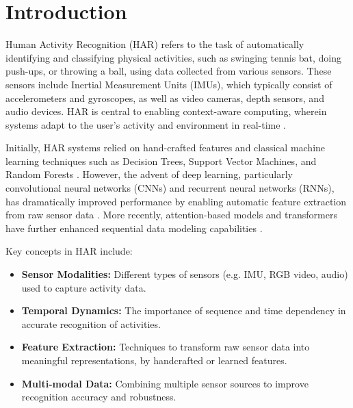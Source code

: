 \chapter{Introduction}
{\renewcommand{\thefootnote}{}}

Human Activity Recognition (HAR) refers to the task of automatically identifying and classifying physical activities, such as swinging tennis bat, doing push-ups, or throwing a ball, using data collected from various sensors. These sensors include Inertial Measurement Units (IMUs), which typically consist of accelerometers and gyroscopes, as well as video cameras, depth sensors, and audio devices. HAR is central to enabling context-aware computing, wherein systems adapt to the user's activity and environment in real-time \cite{lara2012survey, hammerla2016deep}.

Initially, HAR systems relied on hand-crafted features and classical machine learning techniques such as Decision Trees, Support Vector Machines, and Random Forests \cite{lara2012survey}. However, the advent of deep learning, particularly convolutional neural networks (CNNs) and recurrent neural networks (RNNs), has dramatically improved performance by enabling automatic feature extraction from raw sensor data \cite{hammerla2016deep, wang2019deep}. More recently, attention-based models and transformers have further enhanced sequential data modeling capabilities \cite{zeng2018understanding}.

Key concepts in HAR include:
\begin{itemize}
    \item \textbf{Sensor Modalities:} Different types of sensors (e.g. IMU, RGB video, audio) used to capture activity data.
    \item \textbf{Temporal Dynamics:} The importance of sequence and time dependency in accurate recognition of activities.
    \item \textbf{Feature Extraction:} Techniques to transform raw sensor data into meaningful representations, by handcrafted or learned features.
    \item \textbf{Multi-modal Data:} Combining multiple sensor sources to improve recognition accuracy and robustness.
\end{itemize}


